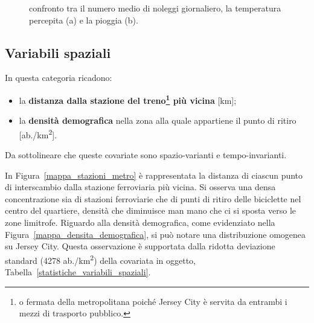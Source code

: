 \begin{figure}[htpb]
	\centering
	\quad
	\quad
	\caption[Confronto tra il numero medio di noleggi giornaliero, la temperatura percepita e la pioggia]{confronto tra il numero medio di noleggi giornaliero, la temperatura percepita (a) e la pioggia (b).}
	\label{ritiri_vs_variabili_meteo}
\end{figure}

\subsection[Variabili spaziali]{Variabili spaziali}
In questa categoria ricadono:
\begin{itemize}
	\item la \textbf{distanza dalla stazione del treno\footnote{o fermata della metropolitana poiché Jersey City è servita da entrambi i mezzi di trasporto pubblico.} più vicina} [\unit{\kilo\meter}];
	\item la \textbf{densità demografica} nella zona alla quale appartiene il punto di ritiro [ab./\unit{\kilo\meter\squared}].
\end{itemize}
Da sottolineare che queste covariate sono spazio-varianti e tempo-invarianti.
\par In Figura~\ref{mappa_stazioni_metro} è rappresentata la distanza di ciascun punto di interscambio dalla stazione ferroviaria più vicina. Si osserva una densa concentrazione sia di stazioni ferroviarie che di punti di ritiro delle biciclette nel centro del quartiere, densità che diminuisce man mano che ci si sposta verso le zone limitrofe. Riguardo alla densità demografica, come evidenziato nella Figura~\ref{mappa_densita_demografica}, si può notare una distribuzione omogenea su Jersey City. Questa osservazione è supportata dalla ridotta deviazione standard (\num{4278} ab./\unit{\kilo\meter\squared}) della covariata in oggetto, Tabella~\ref{statistiche_variabili_spaziali}.

